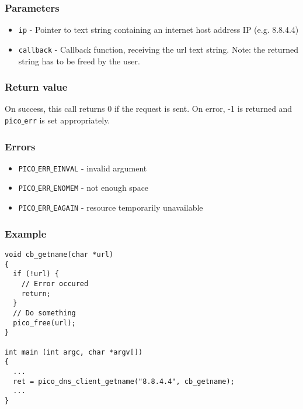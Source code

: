\subsubsection*{Parameters}
\begin{itemize}[noitemsep]
\item \texttt{ip} - Pointer to text string containing an internet host address IP (e.g. 8.8.4.4)
\item \texttt{callback} - Callback function, receiving the url text string. Note: the returned string has to be freed by the user.
\end{itemize}

\subsubsection*{Return value}
On success, this call returns 0 if the request is sent.
On error, -1 is returned and \texttt{pico$\_$err} is set appropriately.

\subsubsection*{Errors}
\begin{itemize}[noitemsep]
\item \texttt{PICO$\_$ERR$\_$EINVAL} - invalid argument
\item \texttt{PICO$\_$ERR$\_$ENOMEM} - not enough space
\item \texttt{PICO$\_$ERR$\_$EAGAIN} - resource temporarily unavailable
\end{itemize}

\subsubsection*{Example}
\begin{verbatim}
void cb_getname(char *url)
{
  if (!url) {
    // Error occured
    return;
  }
  // Do something
  pico_free(url);
}

int main (int argc, char *argv[])
{
  ...
  ret = pico_dns_client_getname("8.8.4.4", cb_getname);
  ...
}
\end{verbatim}